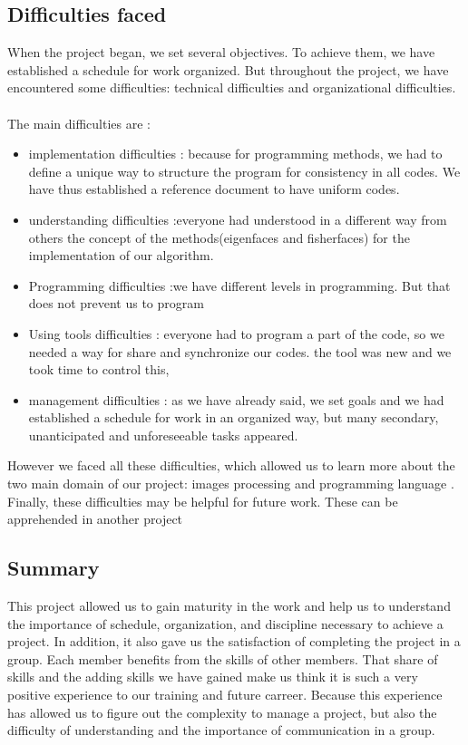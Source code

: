 \subsection{Difficulties faced}

When the project began, we set several objectives. To achieve them, we have established a  schedule for work organized. But throughout the project, we have encountered some difficulties: technical difficulties and organizational difficulties.
\paragraph{} 
The main difficulties are :
\begin{itemize}
\item implementation difficulties : because for programming methods, we had to define a unique way to structure the program for consistency in all codes. We have thus established a reference document to have uniform codes.
\item understanding difficulties :everyone had understood in a different way from others  the concept of the methods(eigenfaces and fisherfaces) for the implementation of our algorithm. 
\item Programming difficulties :we have different levels in programming. But that does not prevent us to program
\item Using tools  difficulties : everyone had to program a part of the code, so we needed a way for share and  synchronize our codes. the tool was new and we took time to control this,
\item management difficulties : as we have already said, we set goals and we had established a schedule for work in an organized way, but many secondary, unanticipated and unforeseeable tasks appeared.
\end{itemize}

However we faced all these difficulties, which allowed us to learn more about the two main domain of our project: images processing and programming language .
Finally, these difficulties may be helpful for future work. These can be apprehended in another project


\subsection{Summary}

This project allowed us to gain maturity in the work and help us  to understand the importance of schedule, organization, and discipline necessary to achieve a project. In addition, it also gave us the satisfaction of completing the project in a group. Each member benefits from the skills of other members. That share of skills and the adding skills we have gained make us think it is such a very positive experience to our training and future carreer. Because this experience has allowed us to figure out the complexity to manage a project, but also the difficulty of understanding and the importance of communication in a group.


